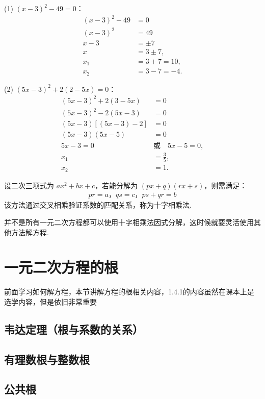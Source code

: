 \documentclass[lang=cn, 10pt, titlestyle=display, oneside, toc=twocol]{elegantbook}
\begin{document}
\begin{solution}
\begin{multicols}{2}
(1) \((x-3)^2-49=0\)：
\begin{align*}
(x-3)^2 - 49 &= 0 \\
(x-3)^2 &= 49 \\
x-3 &= \pm 7 \\
x &= 3 \pm 7, \\
x_1 &= 3 + 7 = 10, \\
x_2 &= 3 - 7 = -4.
\end{align*}

(2) \((5x-3)^2+2(2-5x)=0\)：
\begin{align*}
(5x-3)^2 + 2(3-5x) &= 0 \\
(5x-3)^2 - 2(5x-3) &= 0 \\
(5x-3)\left[(5x-3) - 2\right] &= 0 \\
(5x-3)(5x-5) &= 0 \\
5x-3 = 0 \quad &\text{或} \quad 5x-5 = 0, \\
x_1 &= \frac{3}{5}, \\
x_2 &= 1.
\end{align*}
\end{multicols}
\end{solution}

设二次三项式为 $ax^2 + bx + c$，若能分解为 $(px + q)(rx + s)$，则需满足：
\begin{align*}
pr = a，
qs = c，ps + qr = b
\end{align*}
该方法通过交叉相乘验证系数的匹配关系，称为十字相乘法.
\par
并不是所有一元二次方程都可以使用十字相乘法因式分解，这时候就要灵活使用其他方法解方程.

\section{一元二次方程的根}

前面学习如何解方程，本节讲解方程的根相关内容，1.4.1的内容虽然在课本上是选学内容，但是依旧非常重要

\subsection{韦达定理（根与系数的关系）}

\subsection{有理数根与整数根}

\subsection{公共根}
\end{document}
